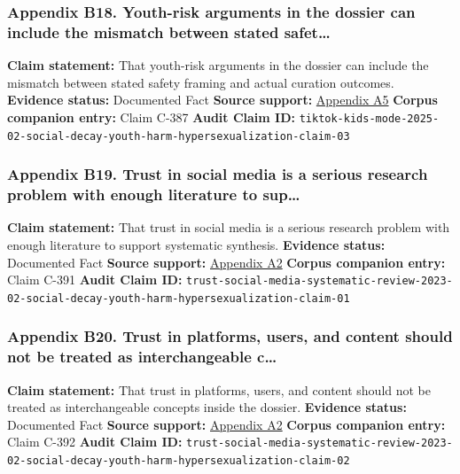 \documentclass[
  american,
  11pt,
  letterpaper,
]{article}
\begin{document}
\subsubsection{Appendix B18. Youth-risk arguments in the dossier can
include the mismatch between stated
safet\ldots{}}\label{ch-02-appendix-b18-youth-risk-arguments-in-the-dossier-can-include-the-mismatch-between-stated-safet}

\textbf{Claim statement:} That youth-risk arguments in the dossier can
include the mismatch between stated safety framing and actual curation
outcomes. \textbf{Evidence status:} Documented Fact \textbf{Source
support:}
\hyperref[ch-02-appendix-a5-when-kids-mode-isn-t-for-kids-investigating-tiktok-s-under-13-experience]{Appendix
A5} \textbf{Corpus companion entry:} Claim C-387 \textbf{Audit Claim
ID:}
\texttt{tiktok-kids-mode-2025-02-social-decay-youth-harm-hypersexualization-claim-03}

\subsubsection{Appendix B19. Trust in social media is a serious research
problem with enough literature to
sup\ldots{}}\label{ch-02-appendix-b19-trust-in-social-media-is-a-serious-research-problem-with-enough-literature-to-sup}

\textbf{Claim statement:} That trust in social media is a serious
research problem with enough literature to support systematic synthesis.
\textbf{Evidence status:} Documented Fact \textbf{Source support:}
\hyperref[ch-02-appendix-a2-what-do-we-mean-when-we-talk-about-trust-in-social-media-a-systematic-review]{Appendix
A2} \textbf{Corpus companion entry:} Claim C-391 \textbf{Audit Claim
ID:}
\texttt{trust-social-media-systematic-review-2023-02-social-decay-youth-harm-hypersexualization-claim-01}

\subsubsection{Appendix B20. Trust in platforms, users, and content
should not be treated as interchangeable
c\ldots{}}\label{ch-02-appendix-b20-trust-in-platforms-users-and-content-should-not-be-treated-as-interchangeable-c}

\textbf{Claim statement:} That trust in platforms, users, and content
should not be treated as interchangeable concepts inside the dossier.
\textbf{Evidence status:} Documented Fact \textbf{Source support:}
\hyperref[ch-02-appendix-a2-what-do-we-mean-when-we-talk-about-trust-in-social-media-a-systematic-review]{Appendix
A2} \textbf{Corpus companion entry:} Claim C-392 \textbf{Audit Claim
ID:}
\texttt{trust-social-media-systematic-review-2023-02-social-decay-youth-harm-hypersexualization-claim-02}
\end{document}
